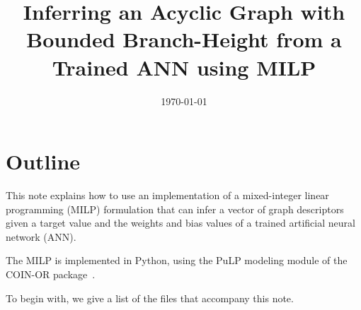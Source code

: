 \documentclass[11pt, titlepage, dvipdfmx, twoside]{article}
\title{\Huge{Inferring an Acyclic Graph with Bounded Branch-Height
			  from a Trained ANN using MILP}}
\begin{document}
\makeatletter 
\let\c@lstlisting\c@figure
\makeatother

\date{\today}

\maketitle


\thispagestyle{empty}
\tableofcontents
\clearpage



\section{Outline}
\label{sec:Intro}

This note explains how to use an implementation of a mixed-integer
linear programming (MILP) formulation that can infer
a vector of graph descriptors given a target value and the 
weights and bias values of a trained artificial neural network (ANN).

The MILP is implemented in Python, 
using the PuLP modeling module of the 
COIN-OR package~\cite{PuLP1,PuLP2,PuLP3,PuLP4}.

To begin with, we give a list of the files that accompany this note.
\end{document}
